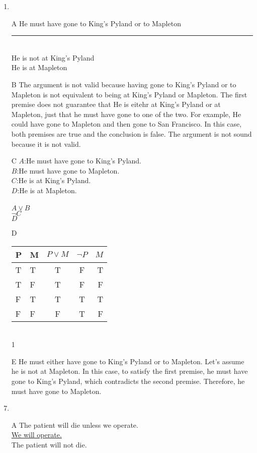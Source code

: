 \documentclass{article}
\newcommand{\thf}{\rule{\textwidth}{.4pt}}
\begin{document}
\begin{enumerate}
	\item
	\item[A]
		He must have gone to King's Pyland or to Mapleton
		\\ \thf \\
		He is not at King's Pyland
		\\He is at Mapleton
	\item[B]
		The argument is not valid because having gone to King's Pyland or to Mapleton is not equivalent to being at King's Pyland or Mapleton. The first premise does not guarantee that He is eitehr at King's Pyland or at Mapleton, just that he must have gone to one of the two. For example, He could have gone to Mapleton and then gone to San Francisco. In this case, both premises are true and the conclusion is false. The argument is not sound because it is not valid.\\
	\item[C]
		$A$:He must have gone to King's Pyland.\\
		$B$:He must have gone to Mapleton.\\
		$C$:He is at King's Pyland.\\
		$D$:He is at Mapleton.\\
		\\
		$A \lor B$\\
		\underline{$\lnot C$}\\
		$D$
	\item[D]
		\begin{tabular}{l | l || c | c || r}
			P & M & $P \lor M$ & $\lnot P$ & $M$\\ \hline
			T & T & T & F & T\\
			T & F & T & F & F\\
			F & T & T & T & T\\
			F & F & F & T & F\\
		\end{tabular}
		\\1
	\item[E]
		He must either have gone to King's Pyland or to Mapleton. Let's assume he is not at Mapleton. In this case, to satisfy the first premise, he must have gone to King's Pyland, which contradicts the second premise. Therefore, he must have gone to Mapleton.
	\item
	\item[A]
		The patient will die unless we operate.
		\\\underline{We will operate.}
		\\The patient will not die.

\end{enumerate}
\end{document}
